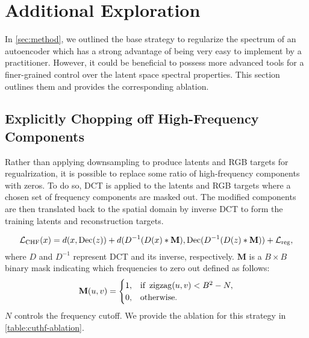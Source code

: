 \section{Additional Exploration}
\label{ap:freq-reg}

In \cref{sec:method}, we outlined the base \regname strategy to regularize the spectrum of an autoencoder which has a strong advantage of being very easy to implement by a practitioner.
However, it could be beneficial to possess more advanced tools for a finer-grained control over the latent space spectral properties.
This section outlines them and provides the corresponding ablation.

\subsection{Explicitly Chopping off High-Frequency Components}

Rather than applying downsampling to produce latents and RGB targets for regualrization, it is possible to replace some ratio of high-frequency components with zeros. To do so, DCT is applied to the latents and RGB targets where a chosen set of frequency components are masked out. The modified components are then translated back to the spatial domain by inverse DCT to form the training latents and reconstruction targets.

\begin{equation}\label{eq:hard-hf-penalty}
\mathcal{L}_\text{CHF}(x) = d(x, \operatorname{Dec}(z)) + d( {D^{-1}}(D({x}) * \mathbf{M}), \operatorname{Dec}({D^{-1}}(D({z}) * \mathbf{M}) ) + \mathcal{L}_\text{reg},
\end{equation}
where $D$ and $D^{-1}$ represent DCT and its inverse, respectively. $\mathbf{M}$ is a $B \times B$ binary mask indicating which frequencies to zero out defined as follows:
\begin{equation}\label{eq:zigzag-mask}
\mathbf{M}(u,v) =
\begin{cases}
    1, & \text{if } \operatorname{zigzag} (u,v) < B^2 - N,\\
    0, & \text{otherwise}.
\end{cases}
\end{equation}
$N$ controls the frequency cutoff. We provide the ablation for this strategy in \cref{table:cuthf-ablation}.

